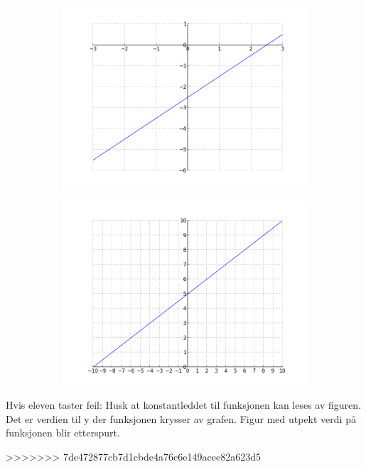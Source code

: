 \documentclass[12pt,twoside,onecolumn]{article}
\begin{document}
\begin{Exercise}
\begin{figure}[h!]
\begin{subfigure}{.5\textwidth}
    \centering
    \includegraphics[scale = 0.5]{figures/Xm25.png}
    \end{subfigure}%
    \begin{subfigure}{.5\textwidth}
    \centering
    \includegraphics[scale = 0.5]{figures/05Xp5.png}
    \end{subfigure}
\end{figure}
{\color{Maroon}Hvis eleven taster feil: Husk at konstantleddet til funksjonen kan leses av figuren. Det er verdien til y der funksjonen krysser av grafen.}
{\color{Maroon}Figur med utpekt verdi på funksjonen blir etterspurt.}
\end{Exercise}
>>>>>>> 7de472877cb7d1cbde4a76c6e149acee82a623d5
\end{document}
